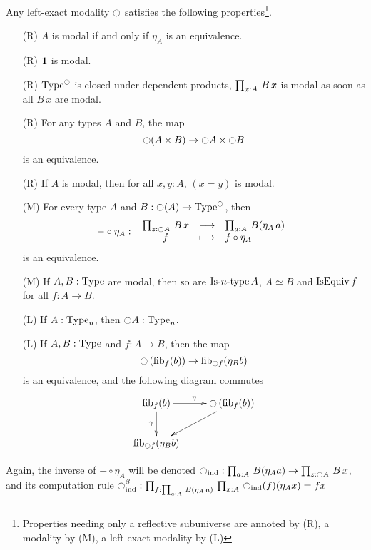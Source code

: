 \begin{prop}\label{prop:mod_prop}
  Any left-exact modality $\ocircle$ satisfies the following
  properties\footnote{Properties needing only a reflective subuniverse
    are annoted by (R), a modality by (M), a left-exact modality by (L)}.
  \begin{itemize}
  \item[\labelitemi(R)] $A$ is modal if and only if $\eta_A$ is an equivalence.
  \item[\labelitemi(R)] $\mathbf{1}$ is modal.
  \item[\labelitemi(R)] $\operatorname{Type}^{\ocircle}$ is closed under dependent
    products, \ie{} $\prod_{x:A}\, B\, x$ is modal as soon as all $B\,
    x$ are modal.
  \item[\labelitemi(R)] For any types $A$ and $B$, the map
    \[ \ocircle(A\times B) \to \ocircle A \times\ocircle B \]
    is an equivalence.
  \item[\labelitemi(R)] If $A$ is modal, then for all $x,y:A$, $(x=y)$
    is modal.
  \item[\labelitemi(M)] For every type $A$ and $B:\ocircle(A)\to\operatorname{Type}^{\ocircle}$, then
    \[ -\circ\eta_A \, \colon \left. \begin{array}{ccl} \prod_{z:\ocircle A}\, B\, x & \longrightarrow & \prod_{a:A}\, B(\eta_A\, a) \\ f & \longmapsto & f\circ \eta_A \end{array} \right. \]
    is an equivalence.
  \item[\labelitemi(M)] If $A,B:\operatorname{Type}$ are modal, then so are $\mathop{\mathrm{Is{\hbox{-}}}n\mathrm{{\hbox{-}} type}} A$, $A\simeq B$ and $\operatorname{IsEquiv} f$ for all $f:A\to B$.
  \item[\labelitemi(L)] If $A:\operatorname{Type}_n$, then $\ocircle A:\operatorname{Type}_n$.
  \item[\labelitemi(L)] If $A,B:\operatorname{Type}$ and $f:A\to B$, then the map
    \[ \ocircle \left( \mathrm{fib}_{f}(b)\right) \to \mathrm{fib}_{\ocircle f}(\eta_B
        b) \]
    is an equivalence, and the following diagram commutes
\[ \xymatrix{
  \fib f b \ar[r]^\eta \ar[d]_\gamma & \modal \left(\fib f b \right) \ar[dl]\\
  \fib{\modal f}{\eta_B b} & }\] 
  \end{itemize}
\end{prop}

\begin{nota}
  Again, the inverse of $- \circ \eta_A$ will be denoted
  $\ocircle_{\mathrm{ind}} : \prod_{a:A}\, B (\eta_A a) \to \prod_{z:\ocircle A}\, B\, x$, and its computation rule
  $\ocircle_{\mathrm{ind}}^\beta : \prod_{f:\prod_{a:A}\, B(\eta_A\, a)}\, \prod_{x:A}\, \ocircle_{\mathrm{ind}}(f)(\eta_A x) = f x$
\end{nota}

